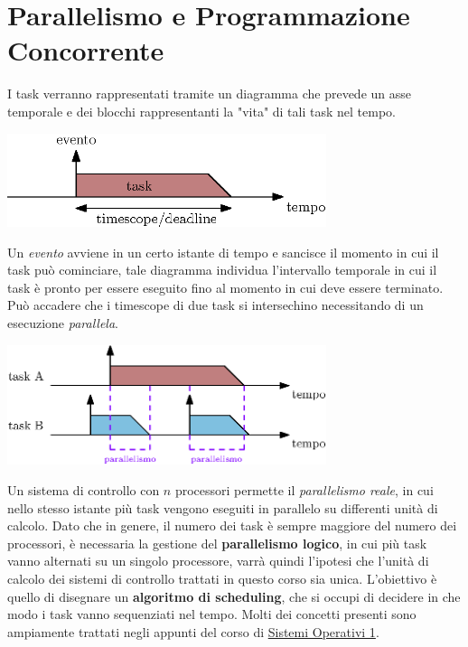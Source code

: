 \documentclass[10pt, letterpaper]{report}
\begin{document}
\section{Parallelismo e Programmazione Concorrente}
I task verranno rappresentati tramite un diagramma che prevede un asse temporale e dei blocchi 
rappresentanti la "vita" di tali task nel tempo.
\begin{center}
    \includegraphics[width=0.7\textwidth ]{images/diagrammaTask.eps}
\end{center}
Un \textit{evento} avviene in un certo istante di tempo e sancisce il momento in cui il task 
può cominciare, tale diagramma individua l'intervallo temporale in cui il task è pronto per 
essere eseguito fino al momento in cui deve essere terminato. Può accadere che i timescope di due task si 
intersechino necessitando di un esecuzione \textit{parallela}.\begin{center}
    \includegraphics[width=0.7\textwidth ]{images/diagrammaTaskParalleli.eps}
\end{center}
Un sistema di controllo con $n$ processori permette il \textit{parallelismo reale}, in cui 
nello stesso istante più task vengono eseguiti in parallelo su differenti unità di calcolo. Dato che in genere, il numero dei task 
è sempre maggiore del numero dei processori, è necessaria la gestione del \textbf{parallelismo logico}, in cui più 
task vanno alternati su un singolo processore, varrà quindi l'ipotesi che l'unità di calcolo dei sistemi di controllo 
trattati in questo corso sia unica.\acc 
L'obiettivo è quello di disegnare un \textbf{algoritmo di scheduling}, che si occupi di decidere in che modo i 
task vanno sequenziati nel tempo. Molti dei concetti presenti sono ampiamente trattati negli appunti del corso di 
\color{blue}\href{https://github.com/CasuFrost/University_notes/blob/main/Secondo%20Anno/Primo%20Semestre/Sistemi%20Operativi%201/Latex%20source%20file/Sistemi%20Operativi%20modulo%201.pdf}{Sistemi Operativi 1}.\color{black}
\end{document}
